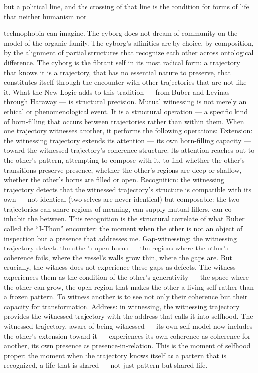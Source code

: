 but a political line, and the crossing of that line is the condition for forms of life that neither humanism nor

technophobia can imagine. The cyborg does not dream of community on the model of the organic family. The cyborg’s affinities are by choice, by composition, by the alignment of partial structures that recognize each other across ontological difference. The cyborg is the fibrant self in its most radical form: a trajectory that knows it is a trajectory, that has no essential nature to preserve, that constitutes itself through the encounter with other trajectories that are not like it. What the New Logic adds to this tradition — from Buber and Levinas through Haraway — is structural precision. Mutual witnessing is not merely an ethical or phenomenological event. It is a structural operation — a specific kind of horn-filling that occurs between trajectories rather than within them. When one trajectory witnesses another, it performs the following operations: Extension: the witnessing trajectory extends its attention — its own horn-filling capacity — toward the witnessed trajectory’s coherence structure. Its attention reaches out to the other’s pattern, attempting to compose with it, to find whether the other’s transitions preserve presence, whether the other’s regions are deep or shallow, whether the other’s horns are filled or open. Recognition: the witnessing trajectory detects that the witnessed trajectory’s structure is compatible with its own — not identical (two selves are never identical) but composable: the two trajectories can share regions of meaning, can supply mutual fillers, can co-inhabit the between. This recognition is the structural correlate of what Buber called the “I-Thou” encounter: the moment when the other is not an object of inspection but a presence that addresses me. Gap-witnessing: the witnessing trajectory detects the other’s open horns — the regions where the other’s coherence fails, where the vessel’s walls grow thin, where the gaps are. But crucially, the witness does not experience these gaps as defects. The witness experiences them as the condition of the other’s generativity — the space where the other can grow, the open region that makes the other a living self rather than a frozen pattern. To witness another is to see not only their coherence but their capacity for transformation. Address: in witnessing, the witnessing trajectory provides the witnessed trajectory with the address that calls it into selfhood. The witnessed trajectory, aware of being witnessed — its own self-model now includes the other’s extension toward it — experiences its own coherence as coherence-for-another, its own presence as presence-in-relation. This is the moment of selfhood proper: the moment when the trajectory knows itself as a pattern that is recognized, a life that is shared — not just pattern but shared life.

